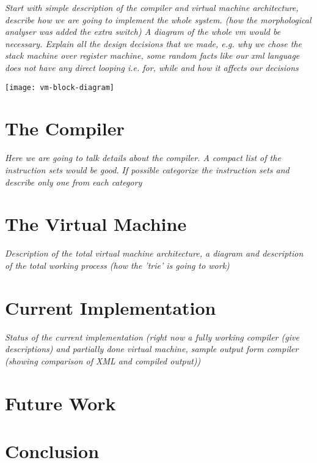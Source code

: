 \documentclass[11pt]{article}
\begin{document}
{\itshape{Start with simple description of the compiler and virtual
    machine architecture, describe how we are going to implement the
    whole system. (how the morphological analyser was added the extra
    switch) A diagram of the whole vm would be
    necessary. Explain all the design decisions that we made, e.g. why
    we chose the stack machine over register machine, some random facts
    like our xml language does not have any direct looping i.e. for,
    while and how it affects our decisions}}

\begin{center}
  \texttt{[image: vm-block-diagram]}
\end{center}


\section{The Compiler}
\label{sec:compiler}

{\itshape{Here we are going to talk details about the compiler. A
    compact list of the instruction sets would be good. If possible
    categorize the instruction sets and describe only one from each
    category}}

\section{The Virtual Machine}
\label{sec:virtual-machine}
{\itshape{Description of the total virtual machine architecture, a
    diagram and description of the total working process (how the
    'trie' is going to work)}}

\section{Current Implementation}
\label{sec:curr-impl}
{\itshape{Status of the current implementation (right now a fully
    working compiler (give descriptions) and partially done virtual
    machine, sample output form compiler (showing comparison of XML
    and compiled output))}}


\section{Future Work}
\label{sec:future-work}

\section{Conclusion}
\label{sec:conclusion}
\end{document}

